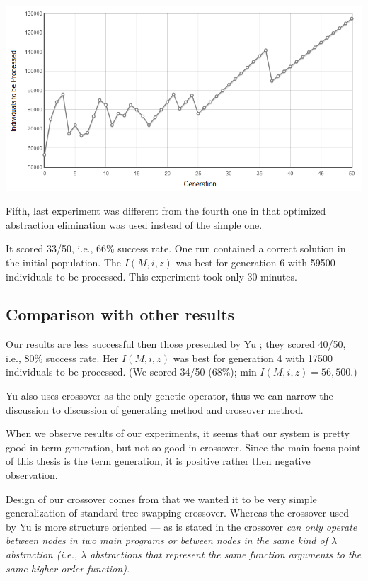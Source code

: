\documentclass[12pt,a4paper]{report}
\begin{document}
\includegraphics[scale=0.65]{reports/ep/report4/indivs.png}

Fifth, last experiment was different from the fourth one in that
optimized abstraction elimination was used instead of the simple one.

It scored 33/50, i.e., 66\% success rate. One run
contained a correct solution in the initial population.
The $I(M,i,z)$ was best for generation 6 with 59500 
individuals to be processed.
This experiment took only 30 minutes. \\

\subsection{Comparison with other results}

Our results are less successful then those 
presented by Yu \cite{yu01};
they scored 40/50, i.e., 80\% success rate.  
Her $I(M,i,z)$ was best for generation 4 with 17500 
individuals to be processed.
(We scored 34/50 (68\%); min $I(M,i,z) = 56,500$.)

Yu also uses crossover as the only genetic operator, thus we
can narrow the discussion to discussion of generating method and 
crossover method. 

When we observe results of our experiments, it seems
that our system is pretty good in term generation, but not so good 
in crossover. Since the main focus point of this thesis is
the term generation, it is positive rather then negative observation.

Design of our crossover comes from that we wanted it to be
very simple generalization of standard tree-swapping crossover.
Whereas the crossover used by Yu is more structure oriented
--- as is stated in \cite{yu01} the crossover \textit{can only operate 
between nodes in two main programs or between nodes in the same
kind of $\lambda$ abstraction (i.e., $\lambda$ abstractions that 
represent the same function arguments to the same higher order function).}
\end{document}
